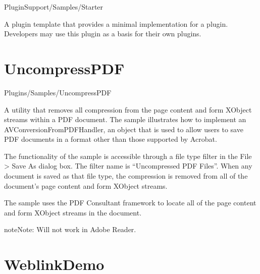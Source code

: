 \documentclass[letterpaper,12pt,english,openany,oneside]{sphinxmanual}
\begin{document}
PluginSupport/Samples/Starter

\label{\detokenize{Samples_Plug_in:description-12}}

A plugin template that provides a minimal implementation for a plugin. Developers may use this plugin as a basis for their own plugins.


\section{UncompressPDF}
\label{\detokenize{Samples_Plug_in:uncompresspdf}}\label{\detokenize{Samples_Plug_in:location-12}}

Plugins/Samples/UncompressPDF

\label{\detokenize{Samples_Plug_in:description-13}}

A utility that removes all compression from the page content and form XObject streams within a PDF document. The sample illustrates how to implement an AVConversionFromPDFHandler, an object that is used to allow users to save PDF documents in a format other than those supported by Acrobat.

\label{\detokenize{Samples_Plug_in:usage-10}}

The functionality of the sample is accessible through a file type filter in the File > Save As dialog box. The filter name is “Uncompressed PDF Files”. When any document is saved as that file type, the compression is removed from all of the document’s page content and form XObject streams.

\label{\detokenize{Samples_Plug_in:implementation-details-4}}

The sample uses the PDF Consultant framework to locate all of the page content and form XObject streams in the document.

\begin{sphinxadmonition}{note}{Note:}
Will not work in Adobe Reader.
\end{sphinxadmonition}


\section{WeblinkDemo}
\label{\detokenize{Samples_Plug_in:weblinkdemo}}\label{\detokenize{Samples_Plug_in:location-13}}
\end{document}
